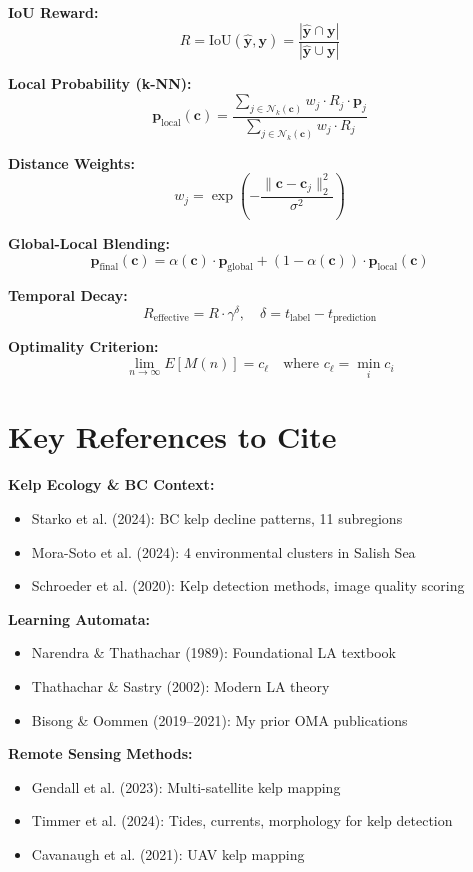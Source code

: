 \documentclass[11pt]{article}
\begin{document}
\textbf{IoU Reward:}
\[
R = \text{IoU}(\hat{\mathbf{y}}, \mathbf{y}) = \frac{|\hat{\mathbf{y}} \cap \mathbf{y}|}{|\hat{\mathbf{y}} \cup \mathbf{y}|}
\]

\textbf{Local Probability (k-NN):}
\[
\mathbf{p}_{\text{local}}(\mathbf{c}) = \frac{\sum_{j \in \mathcal{N}_k(\mathbf{c})} w_j \cdot R_j \cdot \mathbf{p}_j}{\sum_{j \in \mathcal{N}_k(\mathbf{c})} w_j \cdot R_j}
\]

\textbf{Distance Weights:}
\[
w_j = \exp\left(-\frac{\|\mathbf{c} - \mathbf{c}_j\|_2^2}{\sigma^2}\right)
\]

\textbf{Global-Local Blending:}
\[
\mathbf{p}_{\text{final}}(\mathbf{c}) = \alpha(\mathbf{c}) \cdot \mathbf{p}_{\text{global}} + (1 - \alpha(\mathbf{c})) \cdot \mathbf{p}_{\text{local}}(\mathbf{c})
\]

\textbf{Temporal Decay:}
\[
R_{\text{effective}} = R \cdot \gamma^{\delta}, \quad \delta = t_{\text{label}} - t_{\text{prediction}}
\]

\textbf{Optimality Criterion:}
\[
\lim_{n\to\infty} E[M(n)] = c_\ell \quad \text{where } c_\ell = \min_i c_i
\]

\section{Key References to Cite}

\textbf{Kelp Ecology \& BC Context:}
\begin{itemize}
    \item Starko et al. (2024): BC kelp decline patterns, 11 subregions
    \item Mora-Soto et al. (2024): 4 environmental clusters in Salish Sea
    \item Schroeder et al. (2020): Kelp detection methods, image quality scoring
\end{itemize}

\textbf{Learning Automata:}
\begin{itemize}
    \item Narendra \& Thathachar (1989): Foundational LA textbook
    \item Thathachar \& Sastry (2002): Modern LA theory
    \item Bisong \& Oommen (2019--2021): My prior OMA publications
\end{itemize}

\textbf{Remote Sensing Methods:}
\begin{itemize}
    \item Gendall et al. (2023): Multi-satellite kelp mapping
    \item Timmer et al. (2024): Tides, currents, morphology for kelp detection
    \item Cavanaugh et al. (2021): UAV kelp mapping
\end{itemize}
\end{document}
